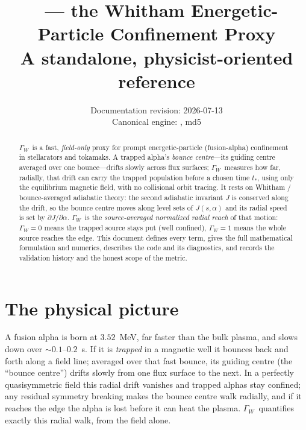 \documentclass[11pt]{article}
\title{\vspace{-1.5em}\textbf{\GW\ --- the Whitham Energetic-Particle Confinement Proxy}\\[0.3em]
\large A standalone, physicist-oriented reference}
\author{}
\date{Documentation revision: 2026-07-13\\[0.2em]
\small Canonical engine: \code{Gamma\_W\_final.py}, md5 \code{b58272e4}}
\newcommand{\GW}{\ensuremath{\Gamma_W}}
\begin{document}
\maketitle
\vspace{-2.5em}

\begin{abstract}
\noindent
\GW\ is a fast, \emph{field-only} proxy for prompt energetic-particle (fusion-alpha)
confinement in stellarators and tokamaks. A trapped alpha's \emph{bounce centre}---its
guiding centre averaged over one bounce---drifts slowly across flux surfaces; \GW\ measures
how far, radially, that drift can carry the trapped population before a chosen time $t_\ast$,
using only the equilibrium magnetic field, with no collisional orbit tracing. It rests on
Whitham / bounce-averaged adiabatic theory: the second adiabatic invariant $J$ is conserved
along the drift, so the bounce centre moves along level sets of $J(s,\alpha)$ and its radial
speed is set by $\partial J/\partial\alpha$. \GW\ is the \emph{source-averaged normalized
radial reach} of that motion: $\GW=0$ means the trapped source stays put (well confined),
$\GW=1$ means the whole source reaches the edge. This document defines every term, gives the
full mathematical formulation and numerics, describes the code and its diagnostics, and
records the validation history and the honest scope of the metric.
\end{abstract}

\tableofcontents
\vspace{1em}

\section{The physical picture}

A fusion alpha is born at $3.52$~MeV, far faster than the bulk plasma, and slows down over
$\sim0.1$--$0.2$~s. If it is \emph{trapped} in a magnetic well it bounces back and forth along
a field line; averaged over that fast bounce, its guiding centre (the ``bounce centre'') drifts
slowly from one flux surface to the next. In a perfectly quasisymmetric field this radial drift
vanishes and trapped alphas stay confined; any residual symmetry breaking makes the bounce
centre walk radially, and if it reaches the edge the alpha is lost before it can heat the
plasma. \GW\ quantifies exactly this radial walk, from the field alone.
\end{document}
